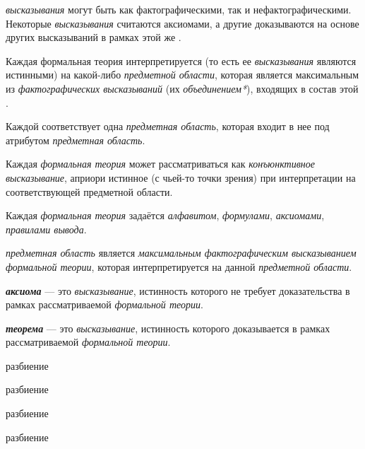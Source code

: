 \textit{высказывания} могут быть как фактографическими, так и нефактографическими. Некоторые \textit{высказывания} считаются аксиомами, а другие доказываются на основе других высказываний в рамках этой же .

Каждая формальная теория интерпретируется (то есть ее \textit{высказывания} являются истинными) на какой-либо \textit{предметной области}, которая является максимальным из \textit{фактографических высказываний} (их \textit{объединением*}),  входящих в состав этой .

Каждой  соответствует одна \textit{предметная область}, которая входит в нее под атрибутом \textit{предметная область\scnrolesign}.

Каждая \textit{формальная теория} может рассматриваться как \textit{конъюнктивное высказывание}, априори истинное (с чьей-то точки зрения) при интерпретации на соответствующей предметной области.

Каждая \textit{формальная теория} задаётся \textit{алфавитом}, \textit{формулами}, \textit{аксиомами}, \textit{правилами вывода}.


\textit{предметная область} является \textit{максимальным фактографическим высказыванием} \textit{формальной теории}, которая интерпретируется на данной \textit{предметной области}.

\textbf{\textit{аксиома}} --- это \textit{высказывание}, истинность которого не требует доказательства в рамках рассматриваемой \textit{формальной теории}.

\textbf{\textit{теорема}} --- это \textit{высказывание}, истинность которого доказывается в рамках рассматриваемой \textit{формальной теории}.

\begin{SCn}
\begin{scnrelfromset}{разбиение}
\end{scnrelfromset}
\begin{scnrelfromset}{разбиение}
\end{scnrelfromset}
\end{SCn}
\begin{SCn}
\begin{scnrelfromset}{разбиение}
\end{scnrelfromset}
\begin{scnrelfromset}{разбиение}
	\begin{scnindent}
	\end{scnindent}
\end{scnrelfromset}
\end{SCn}


